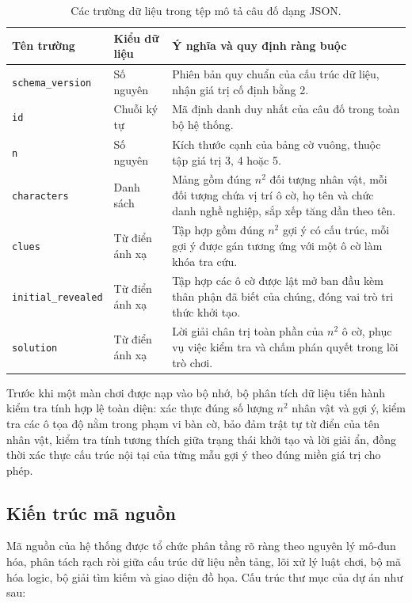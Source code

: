 \begin{table}[H]
\centering
\small
\renewcommand{\arraystretch}{1.3}
\caption{Các trường dữ liệu trong tệp mô tả câu đố dạng JSON.}
\label{tab:truong-cau-do}
\begin{tabularx}{\textwidth}{|l|l|X|}
\hline
\rowcolor{gray!15}
\textbf{Tên trường} & \textbf{Kiểu dữ liệu} & \textbf{Ý nghĩa và quy định ràng buộc} \\
\hline
\texttt{schema\_version} & Số nguyên & Phiên bản quy chuẩn của cấu trúc dữ liệu, nhận giá trị cố định bằng 2. \\
\hline
\texttt{id} & Chuỗi ký tự & Mã định danh duy nhất của câu đố trong toàn bộ hệ thống. \\
\hline
\texttt{n} & Số nguyên & Kích thước cạnh của bảng cờ vuông, thuộc tập giá trị 3, 4 hoặc 5. \\
\hline
\texttt{characters} & Danh sách & Mảng gồm đúng $n^2$ đối tượng nhân vật, mỗi đối tượng chứa vị trí ô cờ, họ tên và chức danh nghề nghiệp, sắp xếp tăng dần theo tên. \\
\hline
\texttt{clues} & Từ điển ánh xạ & Tập hợp gồm đúng $n^2$ gợi ý có cấu trúc, mỗi gợi ý được gán tương ứng với một ô cờ làm khóa tra cứu. \\
\hline
\texttt{initial\_revealed} & Từ điển ánh xạ & Tập hợp các ô cờ được lật mở ban đầu kèm thân phận đã biết của chúng, đóng vai trò tri thức khởi tạo. \\
\hline
\texttt{solution} & Từ điển ánh xạ & Lời giải chân trị toàn phần của $n^2$ ô cờ, phục vụ việc kiểm tra và chấm phán quyết trong lõi trò chơi. \\
\hline
\end{tabularx}
\end{table}

Trước khi một màn chơi được nạp vào bộ nhớ, bộ phân tích dữ liệu tiến hành kiểm tra tính hợp lệ toàn diện: xác thực đúng số lượng $n^2$ nhân vật và gợi ý, kiểm tra các ô tọa độ nằm trong phạm vi bàn cờ, bảo đảm trật tự từ điển của tên nhân vật, kiểm tra tính tương thích giữa trạng thái khởi tạo và lời giải ẩn, đồng thời xác thực cấu trúc nội tại của từng mẫu gợi ý theo đúng miền giá trị cho phép.

\subsection{Kiến trúc mã nguồn}
\label{subsec:kien-truc-ma-nguon}

Mã nguồn của hệ thống được tổ chức phân tầng rõ ràng theo nguyên lý mô-đun hóa, phân tách rạch ròi giữa cấu trúc dữ liệu nền tảng, lõi xử lý luật chơi, bộ mã hóa logic, bộ giải tìm kiếm và giao diện đồ họa. Cấu trúc thư mục của dự án như sau:

